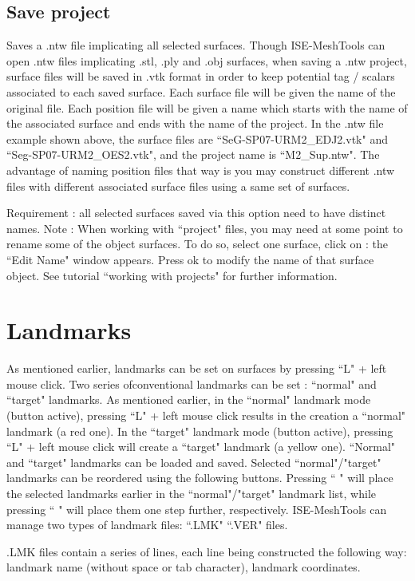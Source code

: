 \subsection{Save project}
Saves a .ntw file implicating all selected surfaces. Though ISE-MeshTools can open .ntw files
implicating .stl, .ply and .obj surfaces, when saving a .ntw project, surface files will be saved in .vtk
format in order to keep potential tag / scalars associated to each saved surface. Each surface file
will be given the name of the original file. Each position file will be given a name which starts with
the name of the associated surface and ends with the name of the project. In the .ntw file example
shown above, the surface files are ``SeG-SP07-URM2_EDJ2.vtk" and ``Seg-SP07-URM2_OES2.vtk",
and the project name is ``M2_Sup.ntw". The advantage of naming position files that way is you may
construct different .ntw files with different associated surface files using a same set of surfaces.

Requirement : all selected surfaces saved via this option
need to have distinct names.
Note : When working with ``project" files, you may need at
some point to rename some of the object surfaces. To do so,
select one surface, click on : the ``Edit Name" window
appears.
Press ok to modify the name of that surface object.
See tutorial ``working with projects" for further information.

\section{Landmarks}
As mentioned earlier, landmarks can be set on surfaces by pressing ``L" + left mouse click.
Two series ofconventional landmarks can be set : ``normal" and ``target" landmarks. As mentioned
earlier, in the ``normal" landmark mode (button active), pressing ``L" + left mouse click results in
the creation a ``normal" landmark (a red one). In the ``target" landmark mode (button active),
pressing ``L" + left mouse click will create a ``target" landmark (a yellow one). ``Normal" and ``target"
landmarks can be loaded and saved.
Selected ``normal"/"target" landmarks can be reordered using the following buttons. Pressing `` "
will place the selected landmarks earlier in the ``normal"/"target" landmark list, while pressing `` "
will place them one step further, respectively.
ISE-MeshTools can manage two types of landmark files: ``.LMK" ``.VER" files.

.LMK files contain a series of lines, each line
being constructed the following way: landmark
name (without space or tab character),
landmark coordinates.

